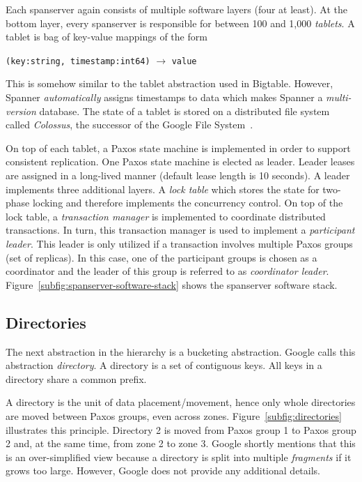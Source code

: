 \documentclass[onecolumn, a4paper, 10pt]{article}
\begin{document}
Each spanserver again consists of multiple software layers (four at least). At
the bottom layer, every spanserver is responsible for between 100 and 1,000
\emph{tablets}. A tablet is bag of key-value mappings of the form
\begin{center}
  \texttt{(key:string, timestamp:int64)} $\rightarrow$ \texttt{value}
\end{center}
This is somehow similar to the tablet abstraction used in Bigtable. However,
Spanner \emph{automatically} assigns timestamps to data which makes Spanner a
\emph{multi-version} database. The state of a tablet is stored on a distributed
file system called \emph{Colossus}, the successor of the Google File
System~\cite{Ghemawat:2003}.

On top of each tablet, a Paxos state machine is implemented in order to support
consistent replication. One Paxos state machine is elected as leader. Leader
leases are assigned in a long-lived manner (default lease length is 10 seconds).
A leader implements three additional layers. A \emph{lock table} which stores the
state for two-phase locking and therefore implements the concurrency control. On
top of the lock table, a \emph{transaction manager} is implemented to coordinate
distributed transactions. In turn, this transaction manager is used to implement
a \emph{participant leader}. This leader is only utilized if a transaction
involves multiple Paxos groups (set of replicas). In this case, one of the
participant groups is chosen as a coordinator and the leader of this group is
referred to as \emph{coordinator leader}.
Figure~\ref{subfig:spanserver-software-stack} shows the spanserver software stack.

\subsection{Directories}
\label{subsec:directories}

The next abstraction in the hierarchy is a bucketing abstraction. Google calls
this abstraction \emph{directory}. A directory is a set of contiguous keys.
All keys in a directory share a common prefix.

A directory is the unit of data placement/movement, hence only whole directories
are moved between Paxos groups, even across zones. Figure~\ref{subfig:directories}
illustrates this principle. Directory 2 is moved from Paxos group 1 to Paxos group
2 and, at the same time, from zone 2 to zone 3. Google shortly mentions that this
is an over-simplified view because a directory is split into multiple
\emph{fragments} if it grows too large. However, Google does not provide any
additional details.
\end{document}
